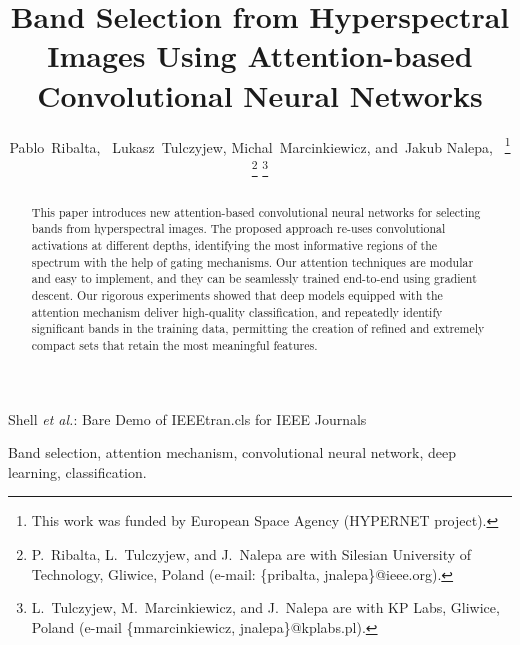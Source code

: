 \documentclass[journal]{IEEEtran}
\begin{document}
\title{Band Selection from Hyperspectral Images Using Attention-based Convolutional Neural Networks}
\author{Pablo~Ribalta,~
        Lukasz~Tulczyjew,
        Michal~Marcinkiewicz,
        and~Jakub Nalepa,~%
\thanks{This work was funded by European Space Agency (HYPERNET project).}
\thanks{P.~Ribalta, L.~Tulczyjew, and J.~Nalepa are with Silesian University of Technology, Gliwice, Poland (e-mail: \{pribalta, jnalepa\}@ieee.org).}%
\thanks{L.~Tulczyjew, M.~Marcinkiewicz, and J.~Nalepa are with KP Labs, Gliwice, Poland (e-mail \{mmarcinkiewicz, jnalepa\}@kplabs.pl).}%
}




%
{Shell \MakeLowercase{\textit{et al.}}: Bare Demo of IEEEtran.cls for IEEE Journals}











\maketitle

\begin{abstract}
This paper introduces new attention-based convolutional neural networks for selecting bands from hyperspectral images. The proposed approach re-uses convolutional activations at different depths, identifying the most informative regions of the spectrum with the help of gating mechanisms. Our attention techniques are modular and easy to implement, and they can be seamlessly trained end-to-end using gradient descent. Our rigorous experiments showed that deep models equipped with the attention mechanism deliver high-quality classification, and repeatedly identify significant bands in the training data, permitting the creation of refined and extremely compact sets that retain the most meaningful features.
\end{abstract}

\begin{IEEEkeywords}
Band selection, attention mechanism, convolutional neural network, deep learning, classification.
\end{IEEEkeywords}


\IEEEpeerreviewmaketitle
\end{document}
